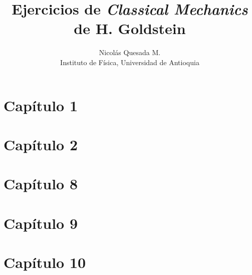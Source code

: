 \documentclass[letterpaper,12pt]{article}
\title{Ejercicios de \emph{Classical Mechanics} de H. Goldstein}
\author{Nicol\'as Quesada M. \\ {\small \sf Instituto de F\'isica, Universidad de Antioquia}}
\date{}
\begin{document}
\maketitle
\section*{Cap\'itulo 1}

\section*{Cap\'itulo 2}

\section*{Cap\'itulo 8}

\section*{Cap\'itulo 9}

\section*{Cap\'itulo 10}

\end{document}
